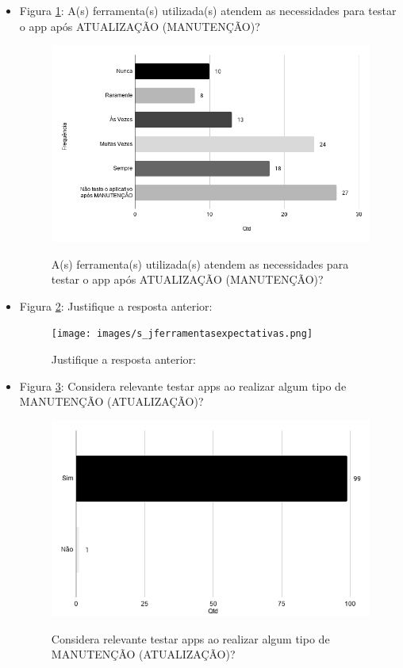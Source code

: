\begin{itemize}
    
    \item Figura \ref{figure:s_ferramentasexpectativas}: A(s) ferramenta(s) utilizada(s) atendem as necessidades para testar o app após ATUALIZAÇÃO (MANUTENÇÃO)?
    \begin{figure}[!htb]
    \centering
    \includegraphics[width=.55\textwidth]{images/s_ferramentasexpectativas.png}
    \label{figure:s_ferramentasexpectativas}
    \caption{A(s) ferramenta(s) utilizada(s) atendem as necessidades para testar o app após ATUALIZAÇÃO (MANUTENÇÃO)?}
    \end{figure}
    
    
    \item Figura \ref{figure:s_jferramentasexpectativas}: Justifique a resposta anterior:
    \begin{figure}[!htb]
    \centering
    \texttt{[image: images/s\_jferramentasexpectativas.png]}
    \label{figure:s_jferramentasexpectativas}
    \caption{Justifique a resposta anterior:}
    \end{figure}
    
    
    \item Figura \ref{figure:s_imptestarmanutencao}: Considera relevante testar apps ao realizar algum tipo de MANUTENÇÃO (ATUALIZAÇÃO)?
    \begin{figure}[!htb]
    \centering
    \includegraphics[width=.55\textwidth]{images/s_imptestarmanutencao.png}
    \label{figure:s_imptestarmanutencao}
    \caption{Considera relevante testar apps ao realizar algum tipo de MANUTENÇÃO (ATUALIZAÇÃO)?}
    \end{figure}
    

\end{itemize}
